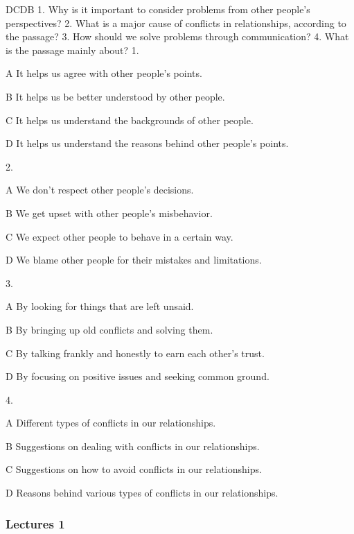 \begin{enumerate}
	DCDB
	1. Why is it important to consider problems from other people's perspectives?
	2. What is a major cause of conflicts in relationships, according to the passage?
	3. How should we solve problems through communication?
	4. What is the passage mainly about?
	1.
	
	A
	It helps us agree with other people's points.
	
	B
	It helps us be better understood by other people.
	
	C
	It helps us understand the backgrounds of other people.
	
	D
	It helps us understand the reasons behind other people's points.
	
	2.
	
	A
	We don't respect other people's decisions.
	
	B
	We get upset with other people's misbehavior.
	
	C
	We expect other people to behave in a certain way.
	
	D
	We blame other people for their mistakes and limitations.
	
	3.
	
	A
	By looking for things that are left unsaid.
	
	B
	By bringing up old conflicts and solving them.
	
	C
	By talking frankly and honestly to earn each other's trust.
	
	D
	By focusing on positive issues and seeking common ground.
	
	4.
	
	A
	Different types of conflicts in our relationships.
	
	B
	Suggestions on dealing with conflicts in our relationships.
	
	C
	Suggestions on how to avoid conflicts in our relationships.
	
	D
	Reasons behind various types of conflicts in our relationships.
\end{enumerate}

\subsubsection{Lectures 1}

